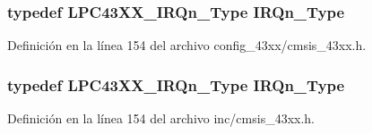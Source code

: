 \subsubsection[{\texorpdfstring{I\+R\+Qn\+\_\+\+Type}{IRQn_Type}}]{\setlength{\rightskip}{0pt plus 5cm}typedef {\bf L\+P\+C43\+X\+X\+\_\+\+I\+R\+Qn\+\_\+\+Type} {\bf I\+R\+Qn\+\_\+\+Type}}\hypertarget{group___c_m_s_i_s__43_x_x_gaebc4a3c3b7989735c473aa4e077cb4a2}{}\label{group___c_m_s_i_s__43_x_x_gaebc4a3c3b7989735c473aa4e077cb4a2}


Definición en la línea 154 del archivo config\+\_\+43xx/cmsis\+\_\+43xx.\+h.

\subsubsection[{\texorpdfstring{I\+R\+Qn\+\_\+\+Type}{IRQn_Type}}]{\setlength{\rightskip}{0pt plus 5cm}typedef {\bf L\+P\+C43\+X\+X\+\_\+\+I\+R\+Qn\+\_\+\+Type} {\bf I\+R\+Qn\+\_\+\+Type}}\hypertarget{group___c_m_s_i_s__43_x_x_gaebc4a3c3b7989735c473aa4e077cb4a2}{}\label{group___c_m_s_i_s__43_x_x_gaebc4a3c3b7989735c473aa4e077cb4a2}


Definición en la línea 154 del archivo inc/cmsis\+\_\+43xx.\+h.

